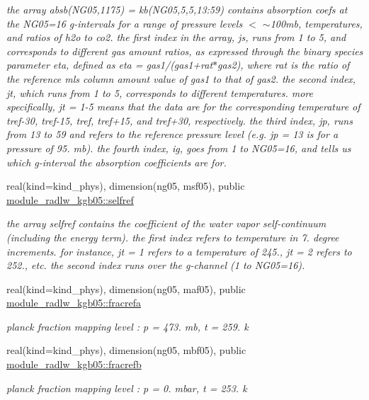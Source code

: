\begin{DoxyCompactItemize}
\begin{DoxyCompactList}\small\item\em the array absb(\+N\+G05,1175) = kb(\+N\+G05,5,5,13\+:59) contains absorption coefs at the N\+G05=16 g-\/intervals for a range of pressure levels $<$ $\sim$100mb, temperatures, and ratios of h2o to co2. the first index in the array, js, runs from 1 to 5, and corresponds to different gas amount ratios, as expressed through the binary species parameter eta, defined as eta = gas1/(gas1+rat$\ast$gas2), where rat is the ratio of the reference mls column amount value of gas1 to that of gas2. the second index, jt, which runs from 1 to 5, corresponds to different temperatures. more specifically, jt = 1-\/5 means that the data are for the corresponding temperature of tref-\/30, tref-\/15, tref, tref+15, and tref+30, respectively. the third index, jp, runs from 13 to 59 and refers to the reference pressure level (e.\+g. jp = 13 is for a pressure of 95. mb). the fourth index, ig, goes from 1 to N\+G05=16, and tells us which g-\/interval the absorption coefficients are for. \end{DoxyCompactList}\item 
real(kind=kind\+\_\+phys), dimension(ng05, msf05), public \hyperlink{group__module__radlw__kgbnn_ga3c727eabe159c88fca912f33a2b91943}{module\+\_\+radlw\+\_\+kgb05\+::selfref}
\begin{DoxyCompactList}\small\item\em the array selfref contains the coefficient of the water vapor self-\/continuum (including the energy term). the first index refers to temperature in 7. degree increments. for instance, jt = 1 refers to a temperature of 245., jt = 2 refers to 252., etc. the second index runs over the g-\/channel (1 to N\+G05=16). \end{DoxyCompactList}\item 
real(kind=kind\+\_\+phys), dimension(ng05, maf05), public \hyperlink{group__module__radlw__kgbnn_ga335fd60e59154f47724d2e25fdf0a5fb}{module\+\_\+radlw\+\_\+kgb05\+::fracrefa}
\begin{DoxyCompactList}\small\item\em planck fraction mapping level \+: p = 473. mb, t = 259. k \end{DoxyCompactList}\item 
real(kind=kind\+\_\+phys), dimension(ng05, mbf05), public \hyperlink{group__module__radlw__kgbnn_gaf7b1fd9c6b966e03a226dd8cbc058670}{module\+\_\+radlw\+\_\+kgb05\+::fracrefb}
\begin{DoxyCompactList}\small\item\em planck fraction mapping level \+: p = 0. mbar, t = 253. k \end{DoxyCompactList}\item 

\end{DoxyCompactItemize}

